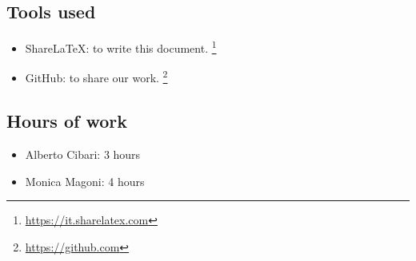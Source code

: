 \subsection*{Tools used}
    \begin{itemize}
        \item ShareLaTeX: to write this document. \footnote{\url{https://it.sharelatex.com}}
        \item GitHub: to share our work. \footnote{\url{https://github.com}} 
    \end{itemize}
\subsection*{Hours of work}
    \begin{itemize}
        \item Alberto Cibari: 3 hours
        \item Monica Magoni: 4 hours
    \end{itemize}
